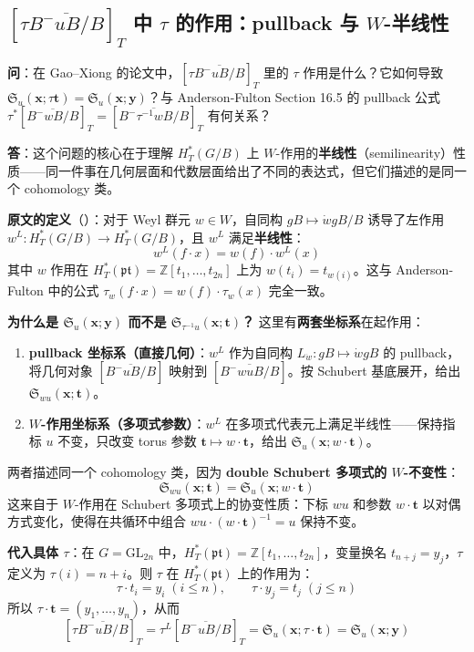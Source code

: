 \subsection{$[\tau\overline{B^-uB/B}]_T$ 中 $\tau$ 的作用：pullback 与 $W$-半线性}\label{sec:qa-tau-left-action}
\textbf{问}：在 Gao--Xiong 的论文中，$[\tau\overline{B^-uB/B}]_T$ 里的 $\tau$ 作用是什么？它如何导致 $\mathfrak{S}_u(\mathbf{x};\tau\mathbf{t}) = \mathfrak{S}_u(\mathbf{x};\mathbf{y})$？与 Anderson-Fulton Section 16.5 的 pullback 公式 $\tau^*[\overline{B^-wB/B}]_T = [\overline{B^-\tau^{-1}wB/B}]_T$ 有何关系？

\textbf{答}：这个问题的核心在于理解 $H_T^*(G/B)$ 上 $W$-作用的\textbf{半线性}（semilinearity）性质——同一件事在几何层面和代数层面给出了不同的表达式，但它们描述的是同一个 cohomology 类。

\textbf{\cite{GX2025} 原文的定义}（\cite[Section 2.2]{GX2025}）：对于 Weyl 群元 $w \in W$，自同构 $gB \mapsto \dot{w}gB/B$ 诱导了左作用 $w^L: H_T^*(G/B) \to H_T^*(G/B)$，且 $w^L$ 满足\textbf{半线性}：
$$w^L(f \cdot x) = w(f) \cdot w^L(x)$$
其中 $w$ 作用在 $H_T^*(\mathfrak{pt}) = \mathbb{Z}[t_1,\ldots,t_{2n}]$ 上为 $w(t_i) = t_{w(i)}$。这与 Anderson-Fulton \cite[Section 16.5]{AndersonFulton} 中的公式 $\tau_w(f\cdot x) = w(f)\cdot\tau_w(x)$ 完全一致。

\textbf{为什么是 $\mathfrak{S}_u(\mathbf{x};\mathbf{y})$ 而不是 $\mathfrak{S}_{\tau^{-1}u}(\mathbf{x};\mathbf{t})$？} 这里有\textbf{两套坐标系}在起作用：
\begin{enumerate}
\item \textbf{pullback 坐标系（直接几何）}：$w^L$ 作为自同构 $L_{\dot{w}}: gB \mapsto \dot{w}gB$ 的 pullback，将几何对象 $[\overline{B^-uB/B}]$ 映射到 $[\overline{B^-wuB/B}]$。按 Schubert 基底展开，给出 $\mathfrak{S}_{wu}(\mathbf{x};\mathbf{t})$。
\item \textbf{$W$-作用坐标系（多项式参数）}：$w^L$ 在多项式代表元上满足半线性——保持指标 $u$ 不变，只改变 torus 参数 $\mathbf{t} \mapsto w\cdot\mathbf{t}$，给出 $\mathfrak{S}_u(\mathbf{x}; w\cdot\mathbf{t})$。
\end{enumerate}
两者描述同一个 cohomology 类，因为 \textbf{double Schubert 多项式的 $W$-不变性}：
$$\mathfrak{S}_{wu}(\mathbf{x};\mathbf{t}) = \mathfrak{S}_u(\mathbf{x}; w\cdot\mathbf{t})$$
这来自于 $W$-作用在 Schubert 多项式上的协变性质：下标 $wu$ 和参数 $w\cdot\mathbf{t}$ 以对偶方式变化，使得在共循环中组合 $wu \cdot (w\cdot\mathbf{t})^{-1} = u$ 保持不变。

\textbf{代入具体 $\tau$}：在 $G = \mathrm{GL}_{2n}$ 中，$H_T^*(\mathfrak{pt}) = \mathbb{Z}[t_1,\ldots,t_{2n}]$，变量换名 $t_{n+j} = y_j$，$\tau$ 定义为 $\tau(i) = n+i$。则 $\tau$ 在 $H_T^*(\mathfrak{pt})$ 上的作用为：
$$\tau\cdot t_i = y_i \;(i\leq n), \qquad \tau\cdot y_j = t_j \;(j\leq n)$$
所以 $\tau\cdot\mathbf{t} = (y_1,\ldots,y_n)$，从而
$$[\tau\overline{B^-uB/B}]_T = \tau^L[\overline{B^-uB/B}]_T = \mathfrak{S}_u(\mathbf{x}; \tau\cdot\mathbf{t}) = \boxed{\mathfrak{S}_u(\mathbf{x};\mathbf{y})}$$

